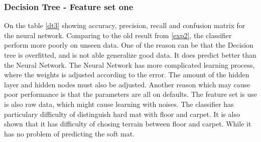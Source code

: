 \documentclass[USenglish]{ifimaster}  %
\begin{document}
\subsubsection{Decision Tree - Feature set one}
On the table \ref{dt3} showing accuracy, precision, recall and confusion matrix for the neural network. Comparing to the old result from \ref{exp2}, the classifier perform more poorly on unseen data. One of the reason can be that the Decision tree is overfitted, and is not able generalize good data. It does predict better than the Neural Network. The Neural Network has more complicated learning process, where the weights is adjusted according to the error. The amount of the hidden layer and hidden nodes must also be adjusted. Another reason which may cause poor performance is that the parameters are all on defaults. The feature set is use is also raw data, which might cause learning with noises. The classifier has particulary difficulty of distinguish hard mat with floor and carpet. It is also shown that it has difficulty of chosing terrain between floor and carpet. While it has no problem of predicting the soft mat. 
\end{document}
